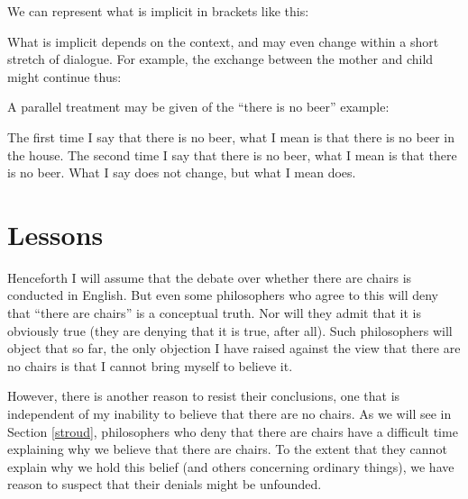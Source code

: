 \documentclass[11pt]{article}
\begin{document}
\begin{spacing}{1.25}
We can represent what is implicit in brackets like this:


\noindent What is implicit depends on the context, and may even change
within a short stretch of dialogue.  For example, the exchange between
the mother and child might continue thus:




A parallel treatment may be given of the ``there is no beer'' example:




The first time I say that there is no beer, what I mean is that there
is no beer in the house.  The second time I say that there is no beer,
what I mean is that there is no beer.  What I say does not change, but
what I mean does.

\section{Lessons}
\label{lessons-verb}
Henceforth I will assume that the debate over whether there are chairs
is conducted in English.  But even some philosophers who agree to this
will deny that ``there are chairs'' is a conceptual truth.  Nor will
they admit that it is obviously true (they are denying that it is
true, after all).  Such philosophers will object that so far, the only
objection I have raised against the view that there are no chairs is
that I cannot bring myself to believe it.

However, there is another reason to resist their conclusions, one that
is independent of my inability to believe that there are no chairs.
As we will see in Section \ref{stroud}, philosophers who deny that
there are chairs have a difficult time explaining why we believe that
there are chairs.  To the extent that they cannot explain why we hold
this belief (and others concerning ordinary things), we have reason to
suspect that their denials might be unfounded.

\ifstandalone
\end{spacing}


\fi
\end{document}
